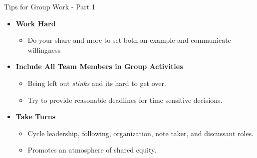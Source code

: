 \begin{frame}{Tips for Group Work - Part 1}

\begin{itemize}
\tightlist
\item
  \textbf{Work Hard}

  \begin{itemize}
  \tightlist
  \item
    Do your share and more to set both an example and communicate
    willingness
  \end{itemize}
\item
  \textbf{Include All Team Members in Group Activities}

  \begin{itemize}
  \tightlist
  \item
    Being left out \emph{stinks} and its hard to get over.
  \item
    Try to provide reasonable deadlines for time sensitive decisions.
  \end{itemize}
\item
  \textbf{Take Turns}

  \begin{itemize}
  \tightlist
  \item
    Cycle leadership, following, organization, note taker, and
    discussant roles.
  \item
    Promotes an atmosphere of shared equity.
  \end{itemize}
\end{itemize}

\end{frame}

